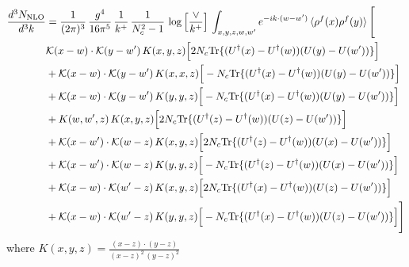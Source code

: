 \documentclass[9pt]{article}
\numberwithin{equation}{section}
\begin{document}
\begin{align}
\frac{d^{3}N_{\mathrm{NLO}}}{d^{3}k} & = \frac{1}{(2\pi)^{3}}\,\frac{g^{4}}{16\pi^{5}}\,\frac{1}{k^{+}}\,\frac{1}{N^{2}_{c}-1}\,\log\Big[\frac{\vee}{k^{+}}\Big]\,\int_{x,y,z,w,w'}e^{-ik\cdot(w-w')}\,\langle\rho^{f}(x)\rho^{f}(y) \rangle\,\Bigg[ \notag\\ & \mathcal K(x-w)\cdot\mathcal K(y-w')\,K(x,y,z)\Big[2 N_{c}{\rm Tr}\{(U^\dagger(x)-U^\dagger(w))(U(y)-U(w'))\}\Big]\notag\\
&+\mathcal K(x-w)\cdot\mathcal K(y-w')\,K(x,x,z)\Big[-N_{c}{\rm Tr}\{(U^\dagger(x)-U^\dagger(w))(U(y)-U(w'))\}\Big]\notag\\
&+\mathcal K(x-w)\cdot\mathcal K(y-w')\,K(y,y,z)\Big[-N_{c}{\rm Tr}\{(U^\dagger(x)-U^\dagger(w))(U(y)-U(w'))\}\Big]\notag\\
&+K(w,w',z)\,K(x,y,z)\Big[2 N_{c}{\rm Tr}\{(U^\dagger(z)-U^\dagger(w))(U(z)-U(w'))\}\Big]\notag\\
&+\mathcal K(x-w')\cdot\mathcal K(w-z)\,K(x,y,z)\Big[2 N_{c}{\rm Tr}\{(U^\dagger(z)-U^\dagger(w))(U(x)-U(w'))\}\Big]\notag\\
&+\mathcal K(x-w')\cdot\mathcal K(w-z)\,K(y,y,z)\Big[-N_{c}{\rm Tr}\{(U^\dagger(z)-U^\dagger(w))(U(x)-U(w'))\}\Big]\notag\\
&+\mathcal K(x-w)\cdot\mathcal K(w'-z)\,K(x,y,z)\Big[2 N_{c}{\rm Tr}\{(U^\dagger(x)-U^\dagger(w))(U(z)-U(w'))\}\Big]\notag\\
&+\mathcal K(x-w)\cdot\mathcal K(w'-z)\,K(y,y,z)\Big[-N_{c}{\rm Tr}\{(U^\dagger(x)-U^\dagger(w))(U(z)-U(w'))\}\Big]\Bigg]
\end{align}
where $K(x,y,z) = \frac{(x-z)\cdot (y-z)}{(x-z)^{2}\, (y-z)^{2}}$
\end{document}
